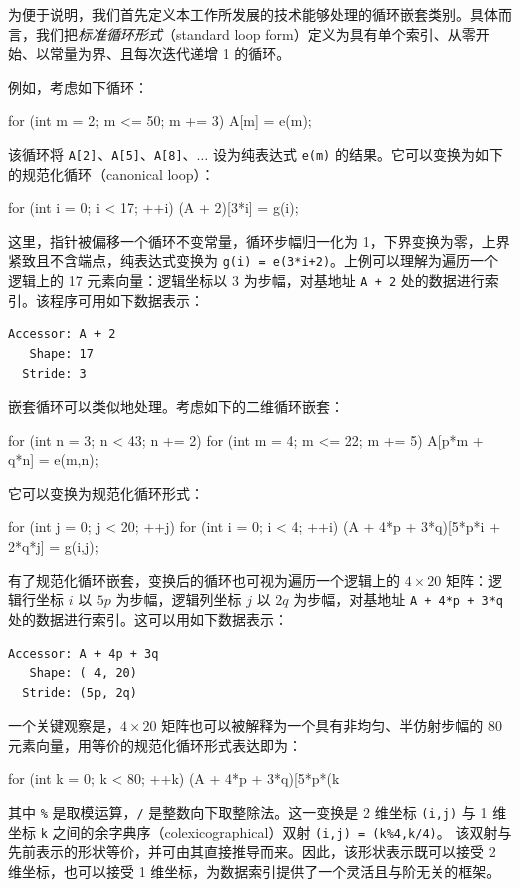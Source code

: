 为便于说明，我们首先定义本工作所发展的技术能够处理的循环嵌套类别。具体而言，我们把{\em 标准循环形式}（standard loop form）定义为具有单个索引、从零开始、以常量为界、且每次迭代递增 1 的循环。

例如，考虑如下循环：
\begin{cpp}
for (int m = 2; m <= 50; m += 3)
  A[m] = e(m);
\end{cpp}
该循环将 {\tt A[2]}、{\tt A[5]}、{\tt A[8]}、$\ldots$ 设为纯表达式 {\tt e(m)} 的结果。它可以变换为如下的规范化循环（canonical loop）：
\begin{cpp}
for (int i = 0; i < 17; ++i)
  (A + 2)[3*i] = g(i);
\end{cpp}
这里，指针被偏移一个循环不变常量，循环步幅归一化为 1，下界变换为零，上界紧致且不含端点，纯表达式变换为 {\tt g(i) = e(3*i+2)}。上例可以理解为遍历一个逻辑上的 17 元素向量：逻辑坐标以 3 为步幅，对基地址 {\tt A + 2} 处的数据进行索引。该程序可用如下数据表示：
\begin{verbatim}
Accessor: A + 2
   Shape: 17
  Stride: 3
\end{verbatim}
嵌套循环可以类似地处理。考虑如下的二维循环嵌套：
\begin{cpp}
for (int n = 3; n < 43; n += 2)
  for (int m = 4; m <= 22; m += 5)
    A[p*m + q*n] = e(m,n);
\end{cpp}
它可以变换为规范化循环形式：
\begin{cpp}
for (int j = 0; j < 20; ++j)
  for (int i = 0; i < 4; ++i)
    (A + 4*p + 3*q)[5*p*i + 2*q*j] = g(i,j);
\end{cpp}
有了规范化循环嵌套，变换后的循环也可视为遍历一个逻辑上的 $4 {\times} 20$ 矩阵：逻辑行坐标 $i$ 以 $5p$ 为步幅，逻辑列坐标 $j$ 以 $2q$ 为步幅，对基地址 {\tt A + 4*p + 3*q} 处的数据进行索引。这可以用如下数据表示：
\begin{verbatim}
Accessor: A + 4p + 3q
   Shape: ( 4, 20)
  Stride: (5p, 2q)
\end{verbatim}
一个关键观察是，$4 {\times} 20$ 矩阵也可以被解释为一个具有非均匀、半仿射步幅的 80 元素向量，用等价的规范化循环形式表达即为：
\begin{cpp}
for (int k = 0; k < 80; ++k)
  (A + 4*p + 3*q)[5*p*(k%
\end{cpp}
其中 {\tt \%} 是取模运算，{\tt /} 是整数向下取整除法。这一变换是 2 维坐标 \verb|(i,j)| 与 1 维坐标 \verb|k| 之间的余字典序（colexicographical）双射 \verb|(i,j) = (k%4,k/4)|。
该双射与先前表示的形状等价，并可由其直接推导而来。因此，该形状表示既可以接受 2 维坐标，也可以接受 1 维坐标，为数据索引提供了一个灵活且与阶无关的框架。

